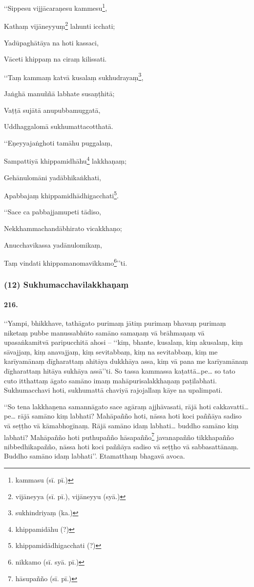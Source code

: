 ‘‘Sippesu vijjācaraṇesu kammesu\footnote{kammasu (sī. pī.)},

Kathaṃ vijāneyyuṃ\footnote{vijāneyya (sī. pī.), vijāneyyu (syā.)} lahunti icchati;

Yadūpaghātāya na hoti kassaci,

Vāceti khippaṃ na ciraṃ kilissati.

‘‘Taṃ kammaṃ katvā kusalaṃ sukhudrayaṃ\footnote{sukhindriyaṃ (ka.)},

Jaṅghā manuññā labhate susaṇṭhitā;

Vaṭṭā sujātā anupubbamuggatā,

Uddhaggalomā sukhumattacotthatā.

‘‘Eṇeyyajaṅghoti tamāhu puggalaṃ,

Sampattiyā khippamidhāhu\footnote{khippamidāhu (?)} lakkhaṇaṃ;

Gehānulomāni yadābhikaṅkhati,

Apabbajaṃ khippamidhādhigacchati\footnote{khippamidādhigacchati (?)}.

‘‘Sace ca pabbajjamupeti tādiso,

Nekkhammachandābhirato vicakkhaṇo;

Anucchavikassa yadānulomikaṃ,

Taṃ vindati khippamanomavikkamo\footnote{nikkamo (sī. syā. pī.)}’’ti.

\subsubsection{(12) Sukhumacchavilakkhaṇaṃ}

\paragraph{216.} ‘‘Yampi, bhikkhave, tathāgato purimaṃ jātiṃ purimaṃ bhavaṃ purimaṃ niketaṃ pubbe manussabhūto samāno samaṇaṃ vā brāhmaṇaṃ vā upasaṅkamitvā paripucchitā ahosi – ‘‘kiṃ, bhante, kusalaṃ, kiṃ akusalaṃ, kiṃ sāvajjaṃ, kiṃ anavajjaṃ, kiṃ sevitabbaṃ, kiṃ na sevitabbaṃ, kiṃ me karīyamānaṃ dīgharattaṃ ahitāya dukkhāya assa, kiṃ vā pana me karīyamānaṃ dīgharattaṃ hitāya sukhāya assā’’ti. So tassa kammassa kaṭattā…pe… so tato cuto itthattaṃ āgato samāno imaṃ mahāpurisalakkhaṇaṃ paṭilabhati. Sukhumacchavi hoti, sukhumattā chaviyā rajojallaṃ kāye na upalimpati.

‘‘So tena lakkhaṇena samannāgato sace agāraṃ ajjhāvasati, rājā hoti cakkavattī…pe… rājā samāno kiṃ labhati? Mahāpañño hoti, nāssa hoti koci paññāya sadiso vā seṭṭho vā kāmabhogīnaṃ. Rājā samāno idaṃ labhati… buddho samāno kiṃ labhati? Mahāpañño hoti puthupañño hāsapañño\footnote{hāsupañño (sī. pī.)} javanapañño tikkhapañño nibbedhikapañño, nāssa hoti koci paññāya sadiso vā seṭṭho vā sabbasattānaṃ. Buddho samāno idaṃ labhati’’. Etamatthaṃ bhagavā avoca.

